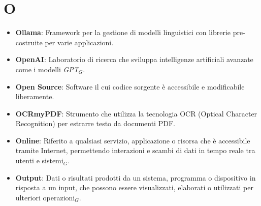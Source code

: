 \section{O}
\begin{itemize}
    \item \textbf{Ollama}: Framework per la gestione di modelli linguistici con librerie pre-costruite per varie applicazioni.
    \item \textbf{OpenAI}: Laboratorio di ricerca che sviluppa intelligenze artificiali avanzate come i modelli \textit{GPT}$_G$.
    \item \textbf{Open Source}: Software il cui codice sorgente è accessibile e modificabile liberamente.
    \item \textbf{OCRmyPDF}: Strumento che utilizza la tecnologia OCR (Optical Character Recognition) per estrarre testo da documenti PDF.
    \item \textbf{Online}: Riferito a qualsiasi servizio, applicazione o risorsa che è accessibile tramite Internet, permettendo interazioni e scambi di dati in tempo reale tra utenti e sistemi$_G$.
    \item \textbf{Output}: Dati o risultati prodotti da un sistema, programma o dispositivo in risposta a un input, che possono essere visualizzati, elaborati o utilizzati per ulteriori operazioni$_G$.

\end{itemize}
